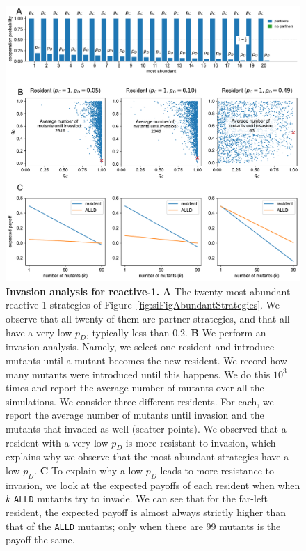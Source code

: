 \documentclass[11pt]{article}
\theoremstyle{plainCl1}
\theoremstyle{plainCl2}
\def\alld{\texttt{ALLD}}
\begin{document}
\begin{figure}[tbhp]
  \centering
  \includegraphics[width=\textwidth]{../../figures/siFigInvasionR1.pdf}
  \caption{\textbf{Invasion analysis for reactive-1.}
  {\bf A} The twenty most abundant reactive-1 strategies of
  Figure~\ref{fig:siFigAbundantStrategies}. We observe that all twenty of them
  are partner strategies, and that all have a very low \(p_D\), typically less
  than 0.2.
  {\bf B} We perform an invasion analysis. Namely, we select one resident and introduce
  mutants until a mutant becomes the new resident. We record how many mutants
  were introduced until this happens. We do this \(10^3\) times and report the
  average number of mutants over all the simulations. We consider three different
  residents. For each, we report the average number of mutants until invasion and
  the mutants that invaded as well (scatter points). We observed that a resident with a very low \(p_D\) is more resistant to
  invasion, which explains why we observe that the most abundant strategies have a
  low \(p_D\). 
  {\bf C} To explain why a low \(p_D\) leads to more resistance to invasion, we
  look at the expected payoffs of each resident when when \(k\) \alld{}
  mutants try to invade. We can see that for the
  far-left resident, the expected payoff is almost always strictly higher than
  that of the \alld{} mutants; only when there are 99 mutants is the payoff the same.}\label{fig:InvasionAnalysisReactive1}
\end{figure}
\end{document}
